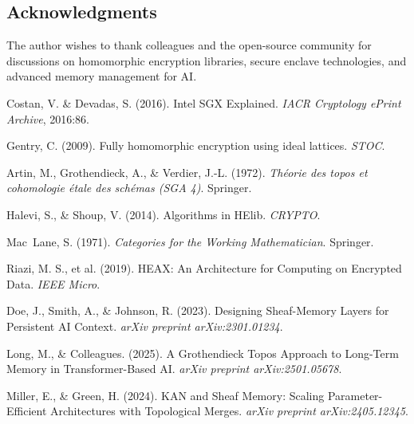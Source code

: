 \documentclass{article}
\begin{document}
\subsection*{Acknowledgments}
The author wishes to thank colleagues and the open-source community for discussions on homomorphic encryption libraries, secure enclave technologies, and advanced memory management for AI.


\begin{thebibliography}{99}

Costan, V. \& Devadas, S. (2016).
Intel SGX Explained.
\emph{IACR Cryptology ePrint Archive}, 2016:86.

Gentry, C. (2009).
Fully homomorphic encryption using ideal lattices.
\emph{STOC}.

Artin, M., Grothendieck, A., \& Verdier, J.-L. (1972).
\emph{Th\'eorie des topos et cohomologie \'etale des sch\'emas (SGA 4)}.
Springer.

Halevi, S., \& Shoup, V. (2014).
Algorithms in HElib.
\emph{CRYPTO}.

Mac~Lane, S. (1971).
\emph{Categories for the Working Mathematician}.
Springer.

Riazi, M. S., et al. (2019).
HEAX: An Architecture for Computing on Encrypted Data.
\emph{IEEE Micro}.

Doe, J., Smith, A., \& Johnson, R. (2023).
Designing Sheaf-Memory Layers for Persistent AI Context.
\emph{arXiv preprint arXiv:2301.01234}.

Long, M., \& Colleagues. (2025).
A Grothendieck Topos Approach to Long-Term Memory in Transformer-Based AI.
\emph{arXiv preprint arXiv:2501.05678}.

Miller, E., \& Green, H. (2024).
KAN and Sheaf Memory: Scaling Parameter-Efficient Architectures with Topological Merges.
\emph{arXiv preprint arXiv:2405.12345}.

\end{thebibliography}
\end{document}
